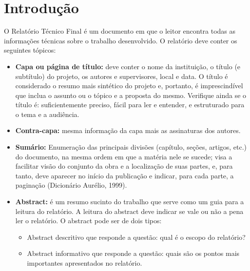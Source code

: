 \graphicspath{{figuras/}}

\chapter{Introdução \label{cap1}}

O Relatório Técnico Final é um documento em que o leitor encontra todas as informações técnicas sobre o trabalho desenvolvido. 
O relatório deve conter os seguintes tópicos:
\begin{itemize}\item {\bf Capa ou página de título: } deve conter o nome da instituição, o título (e subtítulo) do projeto, os autores e supervisores, local e data. O título é considerado o resumo mais sintético do projeto e, portanto, é imprescindível que inclua o assunto ou o tópico e a proposta do mesmo. Verifique ainda se o título é: suficientemente preciso, fácil para ler e entender, e  estruturado para o tema e a audiência. 
\item {\bf Contra-capa: } mesma informação da capa mais as assinaturas dos autores.
\item {\bf Sumário: } Enumeração das principais divisões (capítulo, seções, artigos, etc.) do documento, na mesma ordem em que a matéria nele se sucede; visa a facilitar visão do conjunto da obra e a localização de suas partes, e, para tanto, deve aparecer no início da publicação e indicar, para cada parte, a paginação (Dicionário Aurélio, 1999).
\item {\bf Abstract:} é um resumo sucinto do trabalho que serve como um guia para a leitura do relatório. A leitura do abstract deve indicar se vale ou não a pena ler o relatório. 
O abstract pode ser de dois tipos:

\begin{itemize}
  \item Abstract descritivo que responde a questão: qual é o escopo do relatório?
    \item Abstract informativo que responde a questão: quais são os pontos mais importantes apresentados no relatório.
\end{itemize}


\end{itemize}
